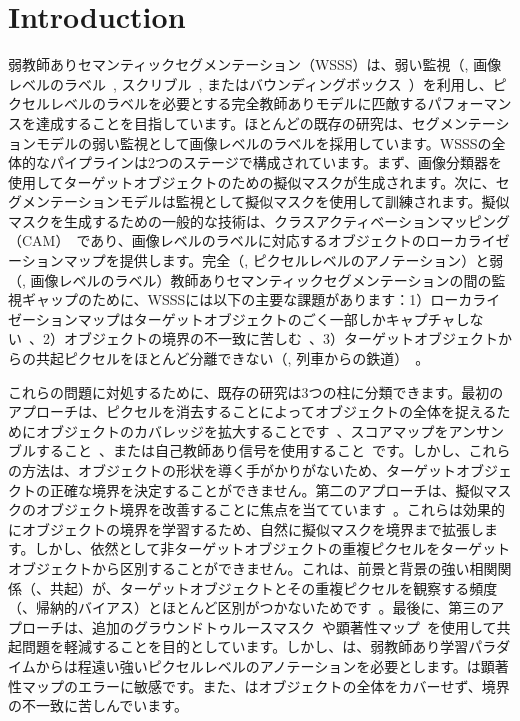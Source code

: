\documentclass[final]{cvpr}
\begin{document}
\section{Introduction}

弱教師ありセマンティックセグメンテーション（WSSS）は、弱い監視（\eg, 画像レベルのラベル~\cite{pathak2015constrained, pinheiro2015image}, スクリブル~\cite{lin2016scribblesup}, またはバウンディングボックス~\cite{khoreva2017simple}）を利用し、ピクセルレベルのラベルを必要とする完全教師ありモデルに匹敵するパフォーマンスを達成することを目指しています。ほとんどの既存の研究は、セグメンテーションモデルの弱い監視として画像レベルのラベルを採用しています。WSSSの全体的なパイプラインは2つのステージで構成されています。まず、画像分類器を使用してターゲットオブジェクトのための擬似マスクが生成されます。次に、セグメンテーションモデルは監視として擬似マスクを使用して訓練されます。擬似マスクを生成するための一般的な技術は、クラスアクティベーションマッピング（CAM）~\cite{zhou2016learning}であり、画像レベルのラベルに対応するオブジェクトのローカライゼーションマップを提供します。完全（\ie, ピクセルレベルのアノテーション）と弱（\ie, 画像レベルのラベル）教師ありセマンティックセグメンテーションの間の監視ギャップのために、WSSSには以下の主要な課題があります：1）ローカライゼーションマップはターゲットオブジェクトのごく一部しかキャプチャしない~\cite{zhou2016learning}、2）オブジェクトの境界の不一致に苦しむ~\cite{kim2017two}、3）ターゲットオブジェクトからの共起ピクセルをほとんど分離できない（\eg, 列車からの鉄道）~\cite{kolesnikov2016seed}。



これらの問題に対処するために、既存の研究は3つの柱に分類できます。最初のアプローチは、ピクセルを消去することによってオブジェクトの全体を捉えるためにオブジェクトのカバレッジを拡大することです~\cite{choe2020attention,kim2017two, li2018tell}、スコアマップをアンサンブルすること~\cite{jiang2019integral, lee2019ficklenet}、または自己教師あり信号を使用すること~\cite{wang2020self}です。しかし、これらの方法は、オブジェクトの形状を導く手がかりがないため、ターゲットオブジェクトの正確な境界を決定することができません。第二のアプローチは、擬似マスクのオブジェクト境界を改善することに焦点を当てています~\cite{fan2020learning,chen2020boundary}。これらは効果的にオブジェクトの境界を学習するため、自然に擬似マスクを境界まで拡張します。しかし、依然として非ターゲットオブジェクトの重複ピクセルをターゲットオブジェクトから区別することができません。これは、前景と背景の強い相関関係（\ie、共起）が、ターゲットオブジェクトとその重複ピクセルを観察する頻度（\ie、帰納的バイアス）とほとんど区別がつかないためです~\cite{choe2020evaluating}。最後に、第三のアプローチは、追加のグラウンドトゥルースマスク~\cite{BMVC2016_92}や顕著性マップ~\cite{oh2017exploiting, yao2020saliency}を使用して共起問題を軽減することを目的としています。しかし、\cite{BMVC2016_92,li2018tell}は、弱教師あり学習パラダイムからは程遠い強いピクセルレベルのアノテーションを必要とします。\cite{oh2017exploiting}は顕著性マップのエラーに敏感です。また、\cite{yao2020saliency}はオブジェクトの全体をカバーせず、境界の不一致に苦しんでいます。
\end{document}
